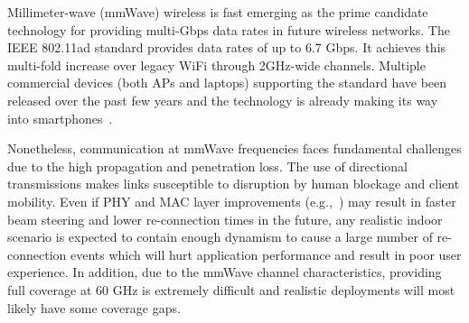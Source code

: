 Millimeter-wave (mmWave) wireless is fast emerging as the prime
candidate technology for providing multi-Gbps data rates in future wireless networks.
The IEEE 802.11ad
standard 
provides data rates of up to 6.7 Gbps. 
It
achieves this multi-fold increase over legacy WiFi through
2GHz-wide channels.
Multiple commercial devices (both APs and laptops) supporting the standard have been
released over the past few years and the technology is already making
its way into smartphones~\cite{peraso_802.11ad,asus_802.11ad}.

Nonetheless, communication at mmWave frequencies faces fundamental
challenges due to the high propagation and penetration loss. %
The use of directional transmissions 
makes
links susceptible to disruption by human blockage and client
mobility. 
Even if PHY and MAC layer
improvements (e.g.,~\cite{nitsche:infocom2015,haider:mobihoc2016,sur:nsdi2016,zhou:infocom2017}) may result in faster beam steering and lower re-connection times in the future, any realistic
indoor scenario is expected to contain enough dynamism
to cause a large number of
re-connection events which will hurt application performance and
result in poor user experience.
In addition, due to the mmWave channel characteristics, providing full coverage at 60 GHz 
is extremely difficult and realistic deployments will most likely have some coverage gaps.

